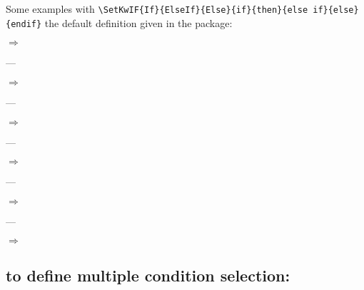 \documentclass[a4paper]{article}
\newcommand{\ExampleOfAlgo}[1]{%
  \begin{minipage}{.4\textwidth}%
  \end{minipage}\hfill$\Longrightarrow$\hfill%
  \begin{minipage}{.45\textwidth}%
    \begin{algorithm}[H]%
    \end{algorithm}%
  \end{minipage}%
}
\begin{document}
Some examples with \verb+\SetKwIF{If}{ElseIf}{Else}{if}{then}{else if}{else}{endif}+ the default definition given
in the package:\par\smallskip \ExampleOfAlgo{algorithm2e_ex01.tex}\par---\par
\ExampleOfAlgo{algorithm2e_ex02.tex}\par---\par
\ExampleOfAlgo{algorithm2e_ex04.tex}\par---\par
\ExampleOfAlgo{algorithm2e_ex05.tex}\par---\par
\ExampleOfAlgo{algorithm2e_ex06.tex}\par---\par
\ExampleOfAlgo{algorithm2e_ex07.tex}\par
{}


\subsection{to define multiple condition selection:}
\label{sec:defswitchmacros}
\end{document}
